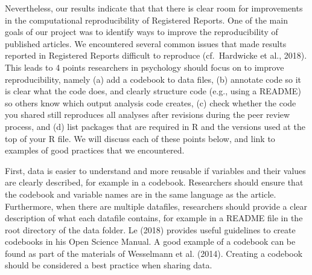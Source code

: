 \documentclass[
  ,jou, a4paper,floatsintext]{apa6}
\begin{document}
Nevertheless, our results indicate that that there is clear room for improvements in the computational reproducibility of Registered Reports. One of the main goals of our project was to identify ways to improve the reproducibility of published articles. We encountered several common issues that made results reported in Registered Reports difficult to reproduce (cf.~Hardwicke et al., 2018). This leads to 4 points researchers in psychology should focus on to improve reproducibility, namely (a) add a codebook to data files, (b) annotate code so it is clear what the code does, and clearly structure code (e.g., using a README) so others know which output analysis code creates, (c) check whether the code you shared still reproduces all analyses after revisions during the peer review process, and (d) list packages that are required in R and the versions used at the top of your R file. We will discuss each of these points below, and link to examples of good practices that we encountered.

First, data is easier to understand and more reusable if variables and their values are clearly described, for example in a codebook. Researchers should ensure that the codebook and variable names are in the same language as the article. Furthermore, when there are multiple datafiles, researchers should provide a clear description of what each datafile contains, for example in a README file in the root directory of the data folder. Le (2018) provides useful guidelines to create codebooks in his Open Science Manual. A good example of a codebook can be found as part of the materials of Wesselmann et al. (2014). Creating a codebook should be considered a best practice when sharing data.
\end{document}
